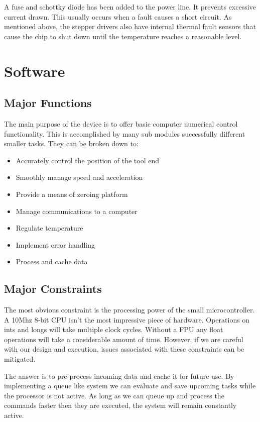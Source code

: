 \documentclass[a4paper, 11pt, twoside]{Thesis}  %
\begin{document}
A fuse and schottky diode has been added to the power line. It prevents excessive current drawn. This usually occurs when a fault causes a short circuit. As mentioned above, the stepper drivers also have internal thermal fault sensors that cause the chip to shut down until the temperature reaches a reasonable level. 
\chapter{Software}
\label{Software}

\section{Major Functions}

The main purpose of the device is to offer basic computer numerical control functionality. This is accomplished by many sub modules successfully different smaller tasks. They can be broken down to:

\begin{itemize}
\item  Accurately control the position of the tool end
\item  Smoothly manage speed and acceleration
\item  Provide a means of zeroing platform
\item  Manage communications to a computer
\item  Regulate temperature
\item  Implement error handling
\item  Process and cache data
\end{itemize}
\section{Major Constraints}

The most obvious constraint is the processing power of the small microcontroller. A 10Mhz 8-bit CPU isn't the most impressive piece of hardware. Operations on ints and longs will take multiple clock cycles. Without a FPU any float operations will take a considerable amount of time. However, if we are careful with our design and execution, issues associated with these constraints can be mitigated.

The answer is to pre-process incoming data and cache it for future use. By implementing a queue like system we can evaluate and save upcoming tasks while the processor is not active. As long as we can queue up and process the commands faster then they are executed, the system will remain constantly active.
\end{document}
